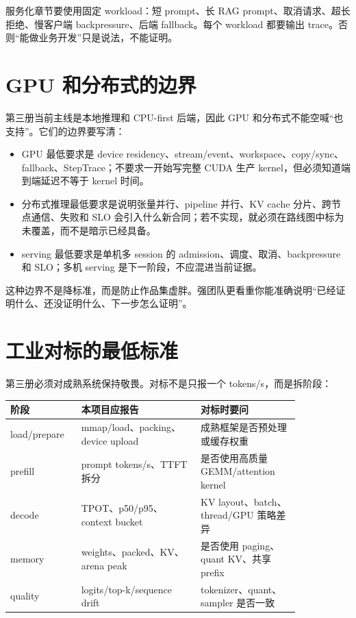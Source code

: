 服务化章节要使用固定 workload：短 prompt、长 RAG prompt、取消请求、超长拒绝、慢客户端 backpressure、后端 fallback。每个 workload 都要输出 trace。否则“能做业务开发”只是说法，不能证明。

\section*{GPU 和分布式的边界}

第三册当前主线是本地推理和 CPU-first 后端，因此 GPU 和分布式不能空喊“也支持”。它们的边界要写清：

\begin{itemize}
  \item GPU 最低要求是 device residency、stream/event、workspace、copy/sync、fallback、StepTrace；不要求一开始写完整 CUDA 生产 kernel，但必须知道端到端延迟不等于 kernel 时间。
  \item 分布式推理最低要求是说明张量并行、pipeline 并行、KV cache 分片、跨节点通信、失败和 SLO 会引入什么新合同；若不实现，就必须在路线图中标为未覆盖，而不是暗示已经具备。
  \item serving 最低要求是单机多 session 的 admission、调度、取消、backpressure 和 SLO；多机 serving 是下一阶段，不应混进当前证据。
\end{itemize}

这种边界不是降标准，而是防止作品集虚胖。强团队更看重你能准确说明“已经证明什么、还没证明什么、下一步怎么证明”。

\section*{工业对标的最低标准}

第三册必须对成熟系统保持敬畏。对标不是只报一个 tokens/s，而是拆阶段：

\begin{center}
\begin{tabular}{p{0.18\linewidth}p{0.36\linewidth}p{0.30\linewidth}}
\toprule
阶段 & 本项目应报告 & 对标时要问 \\
\midrule
load/prepare & mmap/load、packing、device upload & 成熟框架是否预处理或缓存权重 \\
prefill & prompt tokens/s、TTFT 拆分 & 是否使用高质量 GEMM/attention kernel \\
decode & TPOT、p50/p95、context bucket & KV layout、batch、thread/GPU 策略差异 \\
memory & weights、packed、KV、arena peak & 是否使用 paging、quant KV、共享 prefix \\
quality & logits/top-k/sequence drift & tokenizer、quant、sampler 是否一致 \\
\bottomrule
\end{tabular}
\end{center}

